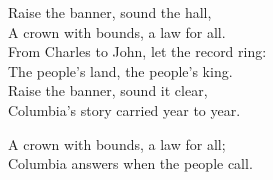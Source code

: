 \begin{lyrics}
Raise the banner, sound the hall,\\
A crown with bounds, a law for all.\\
From Charles to John, let the record ring:\\
The people’s land, the people’s king.\\
Raise the banner, sound it clear,\\
Columbia’s story carried year to year.

A crown with bounds, a law for all;\\
Columbia answers when the people call.
\end{lyrics}

